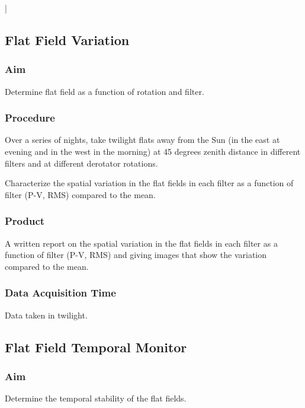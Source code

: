 |\documentclass{article}
\begin{document}
\subsection{Flat Field Variation}

\subsubsection{Aim}

Determine flat field as a function of rotation and filter.

\subsubsection{Procedure}

Over a series of nights, take twilight flats away from the Sun (in the east at evening and in the west in the morning) at 45 degrees zenith distance in different filters and at different derotator rotations.

Characterize the spatial variation in the flat fields in each filter as a function of filter (P-V, RMS) compared to the mean.

\subsubsection{Product}

A written report on the spatial variation in the flat fields in each filter as a function of filter (P-V, RMS) and giving images that show the variation compared to the mean.

\subsubsection{Data Acquisition Time}

Data taken in twilight.


\subsection{Flat Field Temporal Monitor}

\subsubsection{Aim}

Determine the temporal stability of the flat fields.
\end{document}
